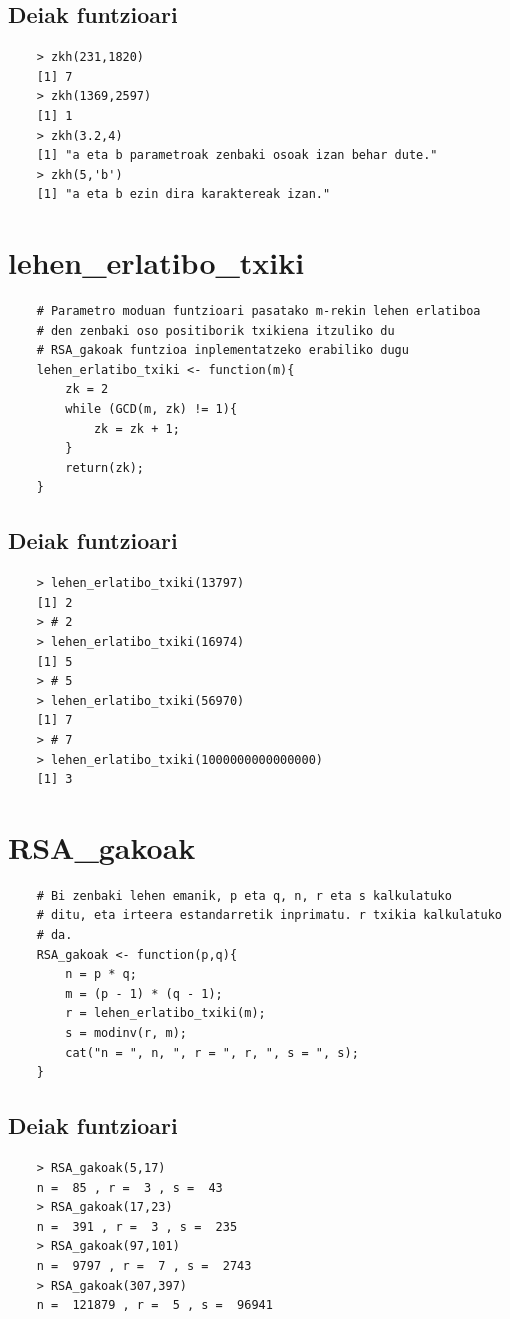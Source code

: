 \documentclass[12pt]{basque-book}
\begin{document}
\newpage

\subsection{Deiak funtzioari}
\begin{verbatim}
    > zkh(231,1820)
    [1] 7
    > zkh(1369,2597)
    [1] 1
    > zkh(3.2,4)
    [1] "a eta b parametroak zenbaki osoak izan behar dute." 
    > zkh(5,'b')
    [1] "a eta b ezin dira karaktereak izan."
\end{verbatim}

\newpage
\section{lehen\_erlatibo\_txiki}
\begin{verbatim}
    # Parametro moduan funtzioari pasatako m-rekin lehen erlatiboa 
    # den zenbaki oso positiborik txikiena itzuliko du
    # RSA_gakoak funtzioa inplementatzeko erabiliko dugu
    lehen_erlatibo_txiki <- function(m){
        zk = 2
        while (GCD(m, zk) != 1){
            zk = zk + 1;
        }
        return(zk);
    }
\end{verbatim}

\subsection{Deiak funtzioari}
\begin{verbatim}
    > lehen_erlatibo_txiki(13797)
    [1] 2
    > # 2
    > lehen_erlatibo_txiki(16974)
    [1] 5
    > # 5
    > lehen_erlatibo_txiki(56970)
    [1] 7
    > # 7
    > lehen_erlatibo_txiki(1000000000000000)
    [1] 3
\end{verbatim}
    
\newpage

\section{RSA\_gakoak}
\begin{verbatim}
    # Bi zenbaki lehen emanik, p eta q, n, r eta s kalkulatuko 
    # ditu, eta irteera estandarretik inprimatu. r txikia kalkulatuko
    # da.
    RSA_gakoak <- function(p,q){
        n = p * q;
        m = (p - 1) * (q - 1);
        r = lehen_erlatibo_txiki(m);
        s = modinv(r, m);
        cat("n = ", n, ", r = ", r, ", s = ", s); 
    }
\end{verbatim}
\subsection{Deiak funtzioari}
\begin{verbatim}
    > RSA_gakoak(5,17)
    n =  85 , r =  3 , s =  43
    > RSA_gakoak(17,23)
    n =  391 , r =  3 , s =  235
    > RSA_gakoak(97,101)
    n =  9797 , r =  7 , s =  2743
    > RSA_gakoak(307,397)
    n =  121879 , r =  5 , s =  96941
\end{verbatim}
\end{document}
